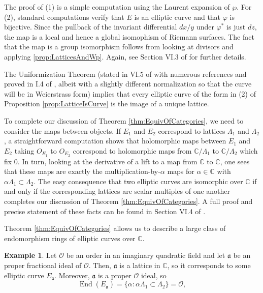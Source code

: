 \documentclass{amsart}
\theoremstyle{definition}
\newtheorem{example}[thm]{Example}
\theoremstyle{remark}
\numberwithin{equation}{section}
\newcommand{\cO}{\mathcal O}
\newcommand{\fka}{\mathfrak a}
\newcommand{\bbC}{\mathbb C}
\DeclareMathOperator{\End}{End}
\begin{document}
 The proof of (1) is a simple computation using the Laurent expansion of $\wp$. For (2), standard computations verify that $E$ is an elliptic curve and that $\varphi$ is bijective. Since the pullback of the invariant differential $dx/y$ under $\varphi^*$ is just $dz$, the map is a local and hence a global isomophism of Riemann surfaces. The fact that the map is a group isomorphism follows from looking at divisors and applying \ref{prop:LatticesAndWp}. Again, see Section VI.3 of \cite{SilvermanAEC} for further details.
 
 The Uniformization Theorem (stated in VI.5 of \cite{SilvermanAEC} with numerous references and proved in I.4 of \cite{SilvermanATAEC}, albeit with a slightly different normalization so that the curve will be in Weierstrass form) implies that every elliptic curve of the form in (2) of Proposition  \ref{prop:LatticeIsCurve} is the image of a unique lattice.
 
 To complete our discussion of Theorem \ref{thm:EquivOfCategories}, we need to consider the maps between objects. If $E_{1}$ and $E_{2}$ correspond to lattices $\Lambda_{1}$ and $\Lambda_{2}$, a straightforward computation shows that holomorphic maps between $E_{1}$ and $E_{2}$ taking $O_{E_{1}}$ to $O_{E_{2}}$ correspond to holomorphic maps from $\bbC /\Lambda_{1}$ to $\bbC/\Lambda_{2}$ which fix $0$. In turn, looking at the derivative of a  lift to a map from $\bbC$ to $\bbC$, one sees that these maps are exactly the multiplication-by-$\alpha$ maps for $\alpha \in \bbC$ with $\alpha\Lambda_{1} \subset \Lambda_{2}$. The easy consequence that two elliptic curves are isomorphic over $\bbC$ if and only if the corresponding lattices are scalar multiples of one another completes our discussion of Theorem \ref{thm:EquivOfCategories}. A full proof and precise statement of these facts can be found in Section VI.4 of \cite{SilvermanAEC}.

 Theorem \ref{thm:EquivOfCategories} allows us to describe a large class of endomorphism rings of elliptic curves over $\bbC$.
 
 \begin{example} \label{ex:CMbyO}
  Let $\cO$ be an order in an imaginary quadratic field and let $\fka$ be an proper fractional ideal of $\cO$. Then, $\fka$ is a lattice in $\bbC$, so it corresponds to some elliptic curve $E_{\fka}$. Moreover, $\fka$ is a proper $\cO$ ideal, so
  \[
  \End(E_{\fka}) = \{\alpha: \alpha \Lambda_{1} \subset \Lambda_{2}\} = \cO,
  \]
 \end{example}
 
\end{document}
